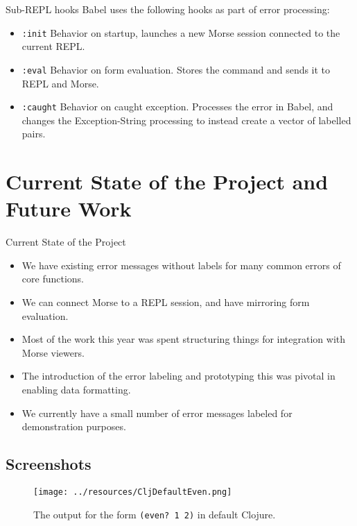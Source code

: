 \documentclass{beamer}
\begin{document}
\begin{frame}{Sub-REPL hooks}
  Babel uses the following hooks as part of error processing:
  \begin{itemize}
    \item<1-> \texttt{:init} Behavior on startup, launches a new Morse session connected to the current REPL.
    \item<2-> \texttt{:eval} Behavior on form evaluation. Stores the command and sends it to REPL and Morse.
    \item<3-> \texttt{:caught} Behavior on caught exception. Processes the error in Babel, and changes the Exception-\>String processing to instead create a vector of labelled pairs.  
  \end{itemize}
\end{frame}

\section{Current State of the Project and Future Work}
\begin{frame}{Current State of the Project}
  \begin{itemize}
    \item<1-> We have existing error messages without labels for many common errors of core functions.
    \item<2-> We can connect Morse to a REPL session, and have mirroring form evaluation.
    \item<3-> Most of the work this year was spent structuring things for integration with Morse viewers.
    \item<4-> The introduction of the error labeling and prototyping this was pivotal in enabling data formatting.
    \item<5-> We currently have a small number of error messages labeled for demonstration purposes.
  \end{itemize}
\end{frame}

\subsection{Screenshots}
\begin{frame}
  \begin{figure}
    \centering
    \texttt{[image: ../resources/CljDefaultEven.png]}
    \caption{The output for the form \texttt{(even? 1 2)} in default Clojure.}
    \label{fig:defaultclj}
  \end{figure}
\end{frame}
\end{document}
